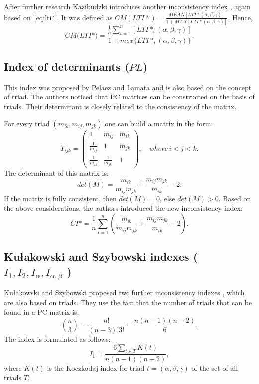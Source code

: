 After further research Kazibudzki introduces another inconsistency index \cite{Kazibudzki2017}, again based on~\ref{eq:lti*}. It was defined as $CM(LTI*)=\frac{MEAN[LTI*(\alpha,\beta,\gamma)]}{1+MAX[LTI*(\alpha,\beta,\gamma)]}$. Hence,
	\begin{equation} 
		\textit{CM(LTI*)}=\frac{\frac{1}{n}\sum_{i=1}^{n}[LTI*_{i}(\alpha,\beta,\gamma)]}{1+max\{LTI*_{i}(\alpha,\beta,\gamma)\}}.
	 \end{equation}
 

\subsection{Index of determinants ($\textit{PL}$)}

This index was proposed by Pelaez and Lamata \cite{PELAEZ2003} and is also based on the concept of triad. The authors noticed that PC  matrices can be constructed on the basis of triads. Their determinant is closely related to the consistency of the matrix.

For every triad $(m_{ik},m_{ij},m_{jk})$ one can build a matrix in the form: 
	\begin{equation} 
		T_{ijk}=\left(\begin{array}{ccc}
			1 & m_{ij} & m_{ik}\\
			\frac{1}{m_{ij}} & 1 & m_{jk}\\
			\frac{1}{m_{ik}} & \frac{1}{m_{jk}} & 1
		\end{array}\right),\,\,\,\,\,\,where\,i<j<k.
	\end{equation}
 The determinant of this matrix is:
	\begin{equation} 
		det(M)=\frac{m_{ik}}{m_{ij}m_{jk}}+\frac{m_{ij}m_{jk}}{m_{ik}}-2.
	 \end{equation}
 If the matrix is fully consistent, then $det(M)=0$, else $det(M)>0$. Based on the above considerations, the authors introduced the new inconsistency index:
 	\begin{equation} 
		CI*=\frac{1}{n}\sum_{i=1}^{n}\left(\frac{m_{ik}}{m_{ij}m_{jk}}+\frac{m_{ij}m_{jk}}{m_{ik}}-2\right).
	 \end{equation}
 

\subsection{Kułakowski and Szybowski indexes ($I_1, I_2, I_{\alpha}, I_{\alpha,\beta}$ ) }

Kułakowski and Szybowski proposed two further inconsistency indexes \cite{KULAKOWSKI20141}, which are also based on triads. They use the fact that the number of triads that can be found in a PC matrix is:
	\begin{equation} 
		\label{eq:nPo3}
		\binom{n}{3}=\frac{n!}{(n-3)!3!}=\frac{n(n-1)(n-2)}{6}.
	 \end{equation}
 The index is formulated as follows:
	 \begin{equation} 
	 \label{eq:I1}		
		I_{1}=\frac{6\sum_{t\in T}K(t)}{n(n-1)(n-2)},
	 \end{equation}
 where $K(t)$ is the Koczkodaj index for triad $t=(\alpha,\beta,\gamma)$ of the set of all triads $T$. 


